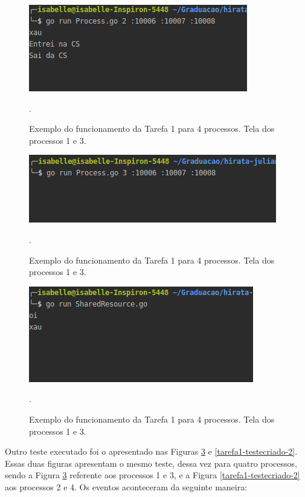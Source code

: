 \documentclass[conference]{IEEEtran}
\begin{document}
\begin{figure}[H]
\centering
\centerline{\includegraphics[scale=0.5]{imagens/ex1-proc2-clean.png}}
\caption{Exemplo do funcionamento da Tarefa 1 para 4 processos. Tela dos processos 1 e 3.}.
\label{tarefa1-testecriado-1}
\end{figure}

\begin{figure}[H]
\centering
\centerline{\includegraphics[scale=0.5]{imagens/ex1-proc3-clean.png}}
\caption{Exemplo do funcionamento da Tarefa 1 para 4 processos. Tela dos processos 1 e 3.}.
\label{tarefa1-testecriado-1}
\end{figure}

\begin{figure}[H]
\centering
\centerline{\includegraphics[scale=0.5]{imagens/ex1-shared-clean.png}}
\caption{Exemplo do funcionamento da Tarefa 1 para 4 processos. Tela dos processos 1 e 3.}.
\label{tarefa1-testecriado-1}
\end{figure}
	
	Outro teste executado foi o apresentado nas Figuras \ref{tarefa1-testecriado-1} e \ref{tarefa1-testecriado-2}. Essas duas figuras apresentam o mesmo teste, dessa vez para quatro processos, sendo a Figura \ref{tarefa1-testecriado-1} referente aos processos 1 e 3, e a Figura \ref{tarefa1-testecriado-2} aos processos 2 e 4. Os eventos aconteceram da seguinte maneira:
	
\end{document}
